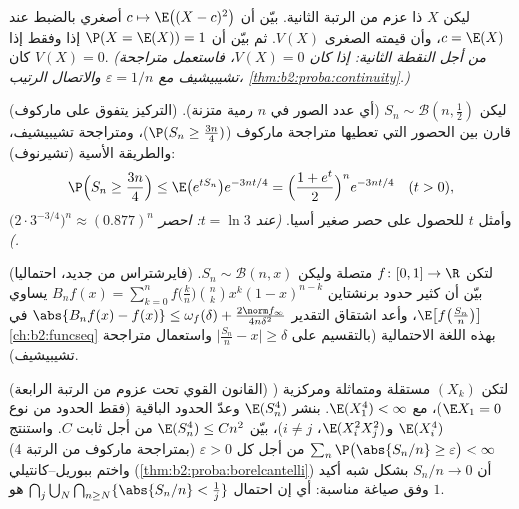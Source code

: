 \begin{exercise}[$\star\star$]\label{exo:b2:randomvar:6}
ليكن $X$ ذا عزم من الرتبة الثانية. بيّن أن $c \mapsto \E\bigl((X -
c)^2\bigr)$ أصغري بالضبط
عند $c = \E(X)$، وأن قيمته الصغرى $V(X)$. ثم بيّن أن $\P(X = \E(X)) = 1$ إذا وفقط
إذا كان $V(X) =
0$. \emph{(من أجل النقطة الثانية: إذا كان $V(X) = 0$،
فاستعمل متراجحة تشيبيشيف مع $\varepsilon = 1/n$ والاتصال الرتيب، \cref{thm:b2:proba:continuity}.)}
\end{exercise}

\begin{exercise}[$\star\star\star$]\label{exo:b2:randomvar:7}
(التركيز يتفوق على ماركوف) ليكن $S_n \sim \mathcal{B}(n,
\frac12)$ (أي عدد الصور في $n$
رمية متزنة). قارن بين الحصور التي تعطيها متراجحة ماركوف ($\P(S_n \geq \frac{3n}{4})$)،
ومتراجحة تشيبيشيف، والطريقة الأسية (تشيرنوف):
\[
\P\Bigl(S_n \geq \frac{3n}4\Bigr)
\leq \E\bigl(e^{tS_n}\bigr)e^{-3nt/4}
= \Bigl(\frac{1 + e^t}{2}\Bigr)^n e^{-3nt/4}
\quad (t > 0),
\]
وأمثل $t$ للحصول على حصر صغير أسيا. \emph{(عند $t = \ln 3$: احصر
$\bigl(2\cdot 3^{-3/4}\bigr)^n \approx
(0.877)^n$.)}
\end{exercise}

\begin{exercise}[$\star\star\star$]\label{exo:b2:randomvar:8}
(فايرشتراس من جديد، احتماليا) لتكن $f \colon [0,1] \to \R$ متصلة وليكن $S_n \sim \mathcal{B}(n, x)$.
بيّن أن كثير حدود برنشتاين $B_nf(x) = \sum_{k=0}^n f\bigl(\frac
kn\bigr)\binom nk x^k(1-x)^{n-k}$ يساوي $\E\bigl[f\bigl(\frac{S_n}{n}\bigr)\bigr]$، وأعد اشتقاق التقدير
$\abs{B_nf(x) - f(x)} \leq \omega_f(\delta) +
\frac{2\norm f_\infty}{4n\delta^2}$ في \cref{ch:b2:funcseq} بهذه اللغة الاحتمالية (بالتقسيم على $\bigl|\frac{S_n}{n} -
x\bigr| \geq \delta$
واستعمال متراجحة تشيبيشيف).
\end{exercise}

\begin{exercise}[$\star\star\star$]\label{exo:b2:randomvar:9}
(القانون القوي تحت عزوم من الرتبة الرابعة) لتكن $(X_k)$ مستقلة
ومتماثلة  ومركزية ($\E X_1 = 0$)، مع $\E(X_1^4) < \infty$. بنشر $\E(S_n^4)$ وعدّ
الحدود الباقية (فقط الحدود من نوع $\E(X_i^4)$ و$\E(X_i^2X_j^2)$، $i
\neq j$)، بيّن
$\E(S_n^4) \leq C n^2$ من أجل ثابت $C$. واستنتج
$\sum_n \P\bigl(\abs{S_n/n} \geq \varepsilon\bigr) < \infty$
من أجل كل $\varepsilon > 0$ (بمتراجحة ماركوف من الرتبة 4) واختم ببوريل--كانتيلي
(\cref{thm:b2:proba:borelcantelli}) أن $S_n/n \to 0$ بشكل شبه أكيد وفق صياغة مناسبة: أي إن احتمال
 $\bigcap_{j}\bigcup_N\bigcap_{n \geq N}\{\abs{S_n/n} <
\frac1j\}$ هو $1$.
\end{exercise}

